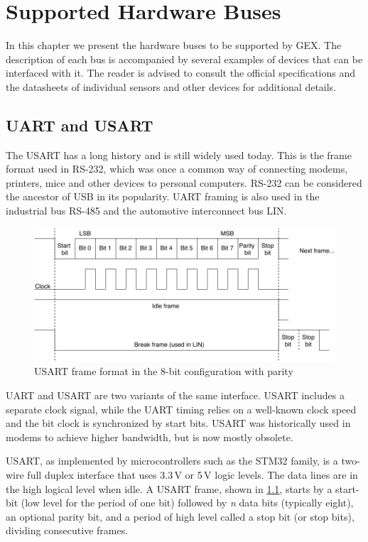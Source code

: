 \chapter{Supported Hardware Buses} \label{ch:hw_buses}

In this chapter we present the hardware buses to be supported by GEX. The description of each bus is accompanied by several examples of devices that can be interfaced with it. The reader is advised to consult the official specifications and the datasheets of individual sensors and other devices for additional details.

\section{UART and USART} \label{sec:theory_usart}

The \acrfull{USART} has a long history and is still widely used today. This is the frame format used in RS-232, which was once a common way of connecting modems, printers, mice and other devices to personal computers. RS-232 can be considered the ancestor of \gls{USB} in its popularity. \gls{UART} framing is also used in the industrial bus RS-485 and the automotive interconnect bus \gls{LIN}.

\begin{figure}[h]
	\centering
	\includegraphics[scale=.9] {img/uart-frame-redraw.pdf}
	\caption[UART frame format]{\label{fig:uart_frame}\gls{USART} frame format in the 8-bit configuration with parity}
\end{figure}

\gls{UART} and \gls{USART} are two variants of the same interface. \gls{USART} includes a separate clock signal, while the \gls{UART} timing relies on a well-known clock speed and the bit clock is synchronized by start bits. \gls{USART} was historically used in modems to achieve higher bandwidth, but is now mostly obsolete.

\gls{USART}, as implemented by microcontrollers such as the STM32 family, is a two-wire full duplex interface that uses 3.3\,V or 5\,V logic levels. The data lines are in the high logical level when idle. A \gls{USART} frame, shown in \cref{fig:uart_frame}, starts by a start-bit (low level for the period of one bit) followed by \textit{n} data bits (typically eight), an optional parity bit, and a period of high level called a stop bit (or stop bits), dividing consecutive frames.

